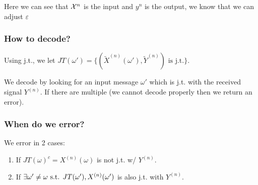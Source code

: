 Here we can see that $\mathcal{X}^n$ is the input and $y^n$ is the output, we know that we can adjust $\varepsilon$

\subsubsection{How to decode?}
Using j.t., we let $JT(\omega') = \{\left(\tilde{X}^{(n)}(\omega'), \tilde{Y}^{(n)}\right) \text{ is j.t.}\}$.

We decode by looking for an input message $\omega'$ which is j.t. with the received signal $Y^{(n)}$. If there are multiple (we cannot decode properly then we return an error).

\subsubsection{When do we error?}
We error in 2 cases:
\begin{enumerate}
    \item If $JT(\omega)^c=X^{(n)}(\omega)$ is not j.t. w/ $Y^{(n)}$.
    \item If $\exists\omega'\neq\omega\text{ s.t. } JT(\omega'), X^{(n)}(\omega')$ is also j.t. with $Y^{(n)}$.
\end{enumerate}

